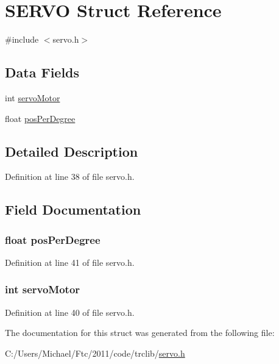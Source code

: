 \hypertarget{struct_s_e_r_v_o}{
\section{SERVO Struct Reference}
\label{struct_s_e_r_v_o}
}


{\ttfamily \#include $<$servo.h$>$}

\subsection*{Data Fields}
\begin{DoxyCompactItemize}
\item 
int \hyperlink{struct_s_e_r_v_o_ab19fa5faefb252269cd205e88057af7e}{servoMotor}
\item 
float \hyperlink{struct_s_e_r_v_o_ada43507c62bb48901d234171e3678b34}{posPerDegree}
\end{DoxyCompactItemize}


\subsection{Detailed Description}


Definition at line 38 of file servo.h.



\subsection{Field Documentation}
\hypertarget{struct_s_e_r_v_o_ada43507c62bb48901d234171e3678b34}{
\subsubsection[{posPerDegree}]{\setlength{\rightskip}{0pt plus 5cm}float {\bf posPerDegree}}}
\label{struct_s_e_r_v_o_ada43507c62bb48901d234171e3678b34}


Definition at line 41 of file servo.h.

\hypertarget{struct_s_e_r_v_o_ab19fa5faefb252269cd205e88057af7e}{
\subsubsection[{servoMotor}]{\setlength{\rightskip}{0pt plus 5cm}int {\bf servoMotor}}}
\label{struct_s_e_r_v_o_ab19fa5faefb252269cd205e88057af7e}


Definition at line 40 of file servo.h.



The documentation for this struct was generated from the following file:\begin{DoxyCompactItemize}
\item 
C:/Users/Michael/Ftc/2011/code/trclib/\hyperlink{servo_8h}{servo.h}\end{DoxyCompactItemize}
